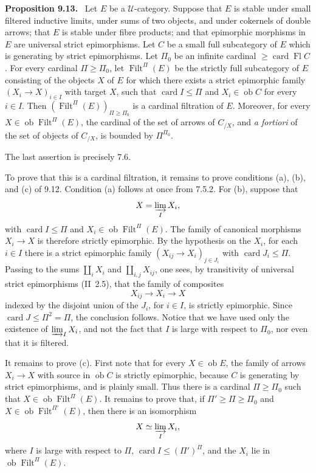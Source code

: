 \documentclass[11pt]{article}
\newcommand{\U}{\mathcal{U}}
\newcommand{\ob}{\operatorname{ob}}
\newcommand{\Filt}{\operatorname{Filt}}
\newcommand{\card}{\operatorname{card}}
\newcommand{\Fl}{\operatorname{Fl}}
\newenvironment{statement}[1]{\par\medskip\noindent\textbf{#1.}\ }{\par\medskip}
\begin{document}
\begin{statement}{Proposition 9.13}
Let $E$ be a $\U$-category. Suppose that $E$ is stable under small filtered inductive limits, under sums of two objects, and under cokernels of double arrows; that $E$ is stable under fibre products; and that epimorphic morphisms in $E$ are universal strict epimorphisms. Let $C$ be a small full subcategory of $E$ which is generating by strict epimorphisms. Let $\Pi_0$ be an infinite cardinal $\geq\card\Fl C$. For every cardinal $\Pi\geq\Pi_0$, let $\Filt^\Pi(E)$ be the strictly full subcategory of $E$ consisting of the objects $X$ of $E$ for which there exists a strict epimorphic family $(X_i\to X)_{i\in I}$ with target $X$, such that $\card I\leq\Pi$ and $X_i\in\ob C$ for every $i\in I$. Then $(\Filt^\Pi(E))_{\Pi\geq\Pi_0}$ is a cardinal filtration of $E$. Moreover, for every $X\in\ob\Filt^\Pi(E)$, the cardinal of the set of arrows of $C_{/X}$, and \emph{a fortiori} of the set of objects of $C_{/X}$, is bounded by $\Pi^{\Pi_0}$.
\end{statement}

The last assertion is precisely 7.6.

To prove that this is a cardinal filtration, it remains to prove conditions (a), (b), and (c) of 9.12. Condition (a) follows at once from 7.5.2. For (b), suppose that
\[
 X=\varinjlim_I X_i,
\]
with $\card I\leq\Pi$ and $X_i\in\ob\Filt^\Pi(E)$. The family of canonical morphisms $X_i\to X$ is therefore strictly epimorphic. By the hypothesis on the $X_i$, for each $i\in I$ there is a strict epimorphic family $(X_{ij}\to X_i)_{j\in J_i}$ with $\card J_i\leq\Pi$. Passing to the sums $\coprod_i X_i$ and $\coprod_{i,j}X_{ij}$, one sees, by transitivity of universal strict epimorphisms (II~2.5), that the family of composites
\[
 X_{ij}\longrightarrow X_i\longrightarrow X
\]
indexed by the disjoint union of the $J_i$, for $i\in I$, is strictly epimorphic. Since $\card J\leq\Pi^2=\Pi$, the conclusion follows. Notice that we have used only the existence of $\varinjlim_I X_i$, and not the fact that $I$ is large with respect to $\Pi_0$, nor even that it is filtered.

It remains to prove (c). First note that for every $X\in\ob E$, the family of arrows $X_i\to X$ with source in $\ob C$ is strictly epimorphic, because $C$ is generating by strict epimorphisms, and is plainly small. Thus there is a cardinal $\Pi\geq\Pi_0$ such that $X\in\ob\Filt^\Pi(E)$. It remains to prove that, if $\Pi'\geq\Pi\geq\Pi_0$ and $X\in\ob\Filt^{\Pi'}(E)$, then there is an isomorphism
\[
 X\simeq \varinjlim_I X_i,
\]
where $I$ is large with respect to $\Pi$, $\card I\leq(\Pi')^\Pi$, and the $X_i$ lie in $\ob\Filt^\Pi(E)$.
\end{document}
